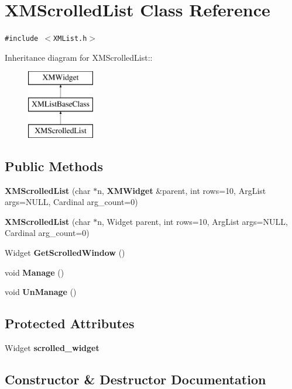 \section{XMScrolled\-List  Class Reference}
\label{classXMScrolledList}
{\tt \#include $<$XMList.h$>$}

Inheritance diagram for XMScrolled\-List::\begin{figure}[H]
\begin{center}
\leavevmode
\includegraphics[height=3cm]{classXMScrolledList}
\end{center}
\end{figure}
\subsection*{Public Methods}
\begin{CompactItemize}
\item 
{\bf XMScrolled\-List} (char $\ast$n, {\bf XMWidget} \&parent, int rows=10, Arg\-List args=NULL, Cardinal arg\_\-count=0)
\item 
{\bf XMScrolled\-List} (char $\ast$n, Widget parent, int rows=10, Arg\-List args=NULL, Cardinal arg\_\-count=0)
\item 
Widget {\bf Get\-Scrolled\-Window} ()
\item 
void {\bf Manage} ()
\item 
void {\bf Un\-Manage} ()
\end{CompactItemize}
\subsection*{Protected Attributes}
\begin{CompactItemize}
\item 
Widget {\bf scrolled\_\-widget}
\end{CompactItemize}


\subsection{Constructor \& Destructor Documentation}
